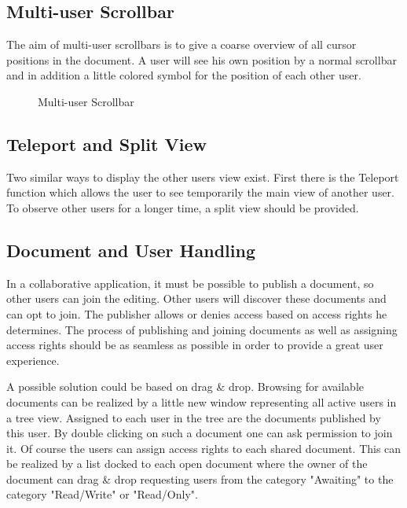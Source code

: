 \documentclass[11pt,a4paper]{article}
\begin{document}
\subsection{Multi-user Scrollbar}
The aim of multi-user scrollbars is to give a coarse overview of all cursor positions in the document. A user will see his own position by a normal scrollbar and in addition a little colored symbol for the position of each other user.
\begin{figure}[H]
\centering
{}
\caption{Multi-user Scrollbar}
\end{figure}

\subsection{Teleport and Split View}
Two similar ways to display the other users view exist. First there is the Teleport function which allows the user to see temporarily the main view of another user. To observe other users for a longer time, a split view should be provided.

\subsection{Document and User Handling}
In a collaborative application, it must be possible to publish a document, so other users can join the editing. Other users will discover these documents and can opt to join. The publisher allows or denies access based on access rights he determines. The process of publishing and joining documents as well as assigning access rights should be as seamless as possible in order to provide a great user experience.

A possible solution could be based on drag \& drop. Browsing for available documents can be realized by a little new window representing all active users in a tree view. Assigned to each user in the tree are the documents published by this user. By double clicking on such a document one can ask permission to join it. Of course the users can assign access rights to each shared document. This can be realized by a list docked to each open document where the owner of the document can drag \& drop requesting users from the category "Awaiting" to the category "Read/Write" or "Read/Only".
\end{document}
